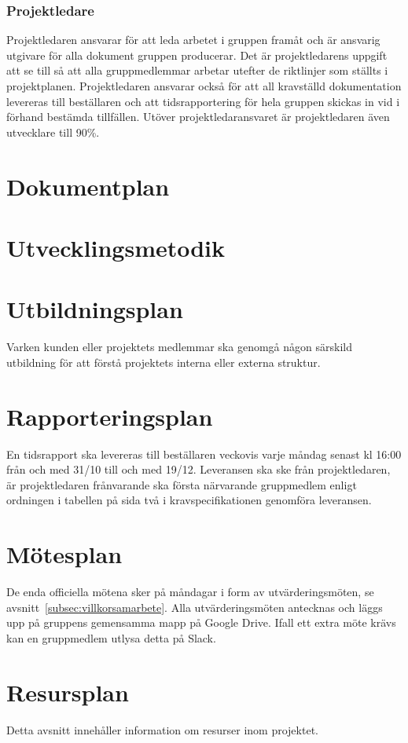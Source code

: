 \documentclass{article}
\begin{document}
\subsubsection{Projektledare}
Projektledaren ansvarar för att leda arbetet i gruppen framåt och är ansvarig utgivare för alla dokument gruppen producerar. Det är projektledarens uppgift att se till så att alla gruppmedlemmar arbetar utefter de riktlinjer som ställts i projektplanen. Projektledaren ansvarar också för att all kravställd dokumentation levereras till beställaren och att tidsrapportering för hela gruppen skickas in vid i förhand bestämda tillfällen. Utöver projektledaransvaret är projektledaren även utvecklare till 90\%.

\section{Dokumentplan}


\section{Utvecklingsmetodik}

\section{Utbildningsplan}
Varken kunden eller projektets medlemmar ska genomgå någon särskild utbildning för att förstå projektets interna eller externa struktur.

\section{Rapporteringsplan}
En tidsrapport ska levereras till beställaren veckovis varje måndag senast kl 16:00 från och med 31/10 till och med 19/12. Leveransen ska ske från projektledaren, är projektledaren frånvarande ska första närvarande gruppmedlem enligt ordningen i tabellen på sida två i kravspecifikationen genomföra leveransen.

\section{Mötesplan}
De enda officiella mötena sker på måndagar i form av utvärderingsmöten, se avsnitt~\ref{subsec:villkorsamarbete}. Alla utvärderingsmöten antecknas och läggs upp på gruppens gemensamma mapp på Google Drive. Ifall ett extra möte krävs kan en gruppmedlem utlysa detta på Slack.

\section{Resursplan}
Detta avsnitt innehåller information om resurser inom projektet.
\end{document}

